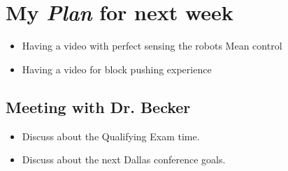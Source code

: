 \section{My \emph{Plan} for next week}

\begin{itemize}
\item Having a video with perfect sensing the robots Mean control
\item Having a video for block pushing experience

\end{itemize}

\subsection{Meeting with Dr. Becker  }

\begin{itemize}
\item Discuss about the Qualifying Exam time.
\item Discuss about the next Dallas conference goals.
\end{itemize}


